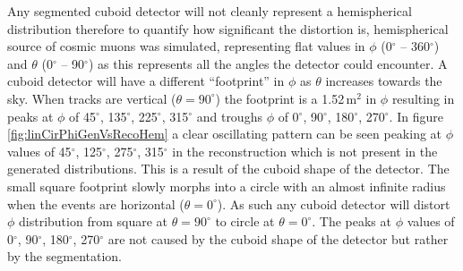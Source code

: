 Any segmented cuboid detector will not cleanly represent a hemispherical distribution therefore to quantify how significant the distortion is, hemispherical source of cosmic muons was simulated, representing flat values in $\phi$ (0$^\circ$ -- 360$^\circ$) and $\theta$ (0$^\circ$ -- 90$^\circ$) as this represents all the angles the detector could encounter. A cuboid detector will have a different ``footprint'' in $\phi$ as $\theta$ increases towards the sky. When tracks are vertical ($\theta = 90^\circ$) the footprint is a 1.52\,m$^2$ in $\phi$ resulting in peaks at $\phi$ of 45$^\circ$, 135$^\circ$, 225$^\circ$, 315$^\circ$ and troughs $\phi$ of 0$^\circ$, 90$^\circ$, 180$^\circ$, 270$^\circ$. In figure \ref{fig:linCirPhiGenVsRecoHem} a clear oscillating pattern can be seen peaking at $\phi$ values of 45$^\circ$, 125$^\circ$, 275$^\circ$, 315$^\circ$ in the reconstruction which is not present in the generated distributions. This is a result of the cuboid shape of the detector. The small square footprint slowly morphs into a circle with an almost infinite radius when the events are horizontal ($\theta = 0^\circ$). As such any cuboid detector will distort $\phi$ distribution from square at $\theta = 90^\circ$ to circle at $\theta = 0^\circ$. The peaks at $\phi$ values of 0$^\circ$, 90$^\circ$, 180$^\circ$, 270$^\circ$ are not caused by the cuboid shape of the detector but rather by the segmentation. 
